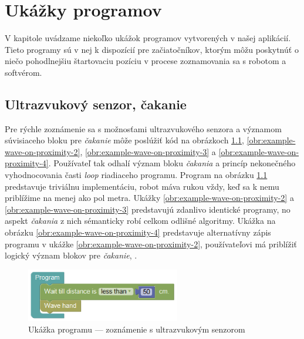
\chapter{Ukážky programov}
\label{kap:ukazky-programov}

V kapitole uvádzame niekoľko ukážok programov vytvorených v našej aplikácií. Tieto programy sú v nej k dispozícií pre začiatočníkov, ktorým môžu poskytnúť o niečo pohodlnejšiu štartovaciu pozíciu v procese zoznamovania sa s robotom a softvérom.

\section{Ultrazvukový senzor, čakanie}
Pre rýchle zoznámenie sa s možnosťami ultrazvukového senzora a významom súvisiaceho bloku pre \textit{čakanie} môže poslúžiť kód na obrázkoch \ref{obr:example-wave-on-proximity}, \ref{obr:example-wave-on-proximity-2}, \ref{obr:example-wave-on-proximity-3} a \ref{obr:example-wave-on-proximity-4}. Používateľ tak odhalí význam bloku \textit{čakania} a princíp nekonečného vyhodnocovania časti \textit{loop} riadiaceho programu. Program na obrázku \ref{obr:example-wave-on-proximity} predstavuje triviálnu implementáciu, robot máva rukou vždy, keď sa k nemu priblížime na menej ako pol metra. Ukážky \ref{obr:example-wave-on-proximity-2} a \ref{obr:example-wave-on-proximity-3} predstavujú zdanlivo identické programy, no aspekt \textit{čakania} z nich sémanticky robí celkom odlišné algoritmy. Ukážka na obrázku \ref{obr:example-wave-on-proximity-4} predstavuje alternatívny zápis programu v ukážke \ref{obr:example-wave-on-proximity-2}, používateľovi má priblížiť logický význam blokov pre \textit{čakanie}, .

\vspace{1cm}

\begin{figure}[h]
\centerline{\includegraphics[width=0.6\textwidth]{images/example-wave-on-proximity}}
\caption[Ukážka programu --- zoznámenie s ultrazvukovým senzorom]{Ukážka programu --- zoznámenie s ultrazvukovým senzorom}
\label{obr:example-wave-on-proximity}
\end{figure}

